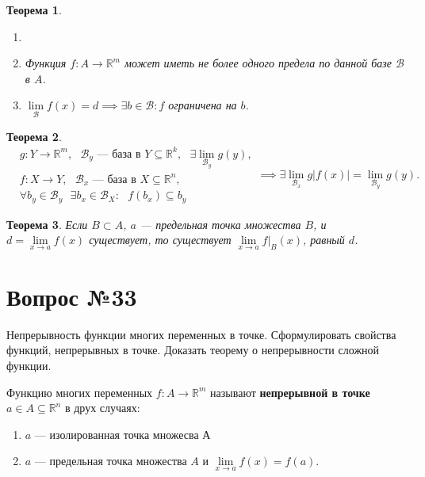 \documentclass[12pt]{report}
\numberwithin{equation}{section}
\newtheorem{theorem}{Теорема}[section]
\begin{document}
\begin{theorem} \label{th:32:2}
\begin{enumerate}
\item[]
\item[а)] Функция $f : A \to \mathbb{R}^m$ может иметь не более одного предела по данной базе $\mathcal{B}$ в $A$.
\item[б)] $\lim\limits_{\mathcal{B}} f(x) = d \implies \exists b \in \mathcal{B} : f$ ограничена на $b$.
\end{enumerate}
\end{theorem}
\begin{theorem} \label{th:32:3}
\[\begin{aligned}
&g : Y \to \mathbb{R}^m,~~~ \mathcal{B}_y \text{ --- база в } Y \subseteq \mathbb{R}^k,~~~\exists \lim_{\mathcal{B}_y} g(y),\\
&f : X \to Y,~~~\mathcal{B}_x \text{ --- база в } X \subseteq \mathbb{R}^n,\\
&\forall b_y \in \mathcal{B}_y ~~~ \exists b_x \in \mathcal{B}_X : ~~~f(b_x) \subseteq b_y
\end{aligned} \implies \exists \lim_{\mathcal{B}_x}g|f(x)| = \lim_{\mathcal{B}_y} g(y).\]
\end{theorem}


\begin{theorem} \label{th:32:4}
Если $B \subset A$, $a$ --- предельная точка множества $B$, и $d = \lim\limits_{x \to a} f(x)$ существует, то существует $\lim\limits_{x \to a} f\big\vert_B(x)$, равный $d$.
\end{theorem}

\newpage \section{Вопрос №33} %
\begin{framed}
Непрерывность функции многих переменных в точке. Сформулировать свойства функций, непрерывных в точке. Доказать теорему о непрерывности сложной функции.
\end{framed}

Функцию многих переменных $f : A \to \mathbb{R}^m$ называют \textbf{непрерывной в точке} $a \in A \subseteq \mathbb{R}^n$ в друх случаях:
\begin{enumerate}
\item[1)] $a$ --- изолированная точка множесва А
\item[2)] $a$ --- предельная точка множества $A$ и $\lim\limits_{x \to a}f(x) = f(a).$
\end{enumerate}
\end{document}

